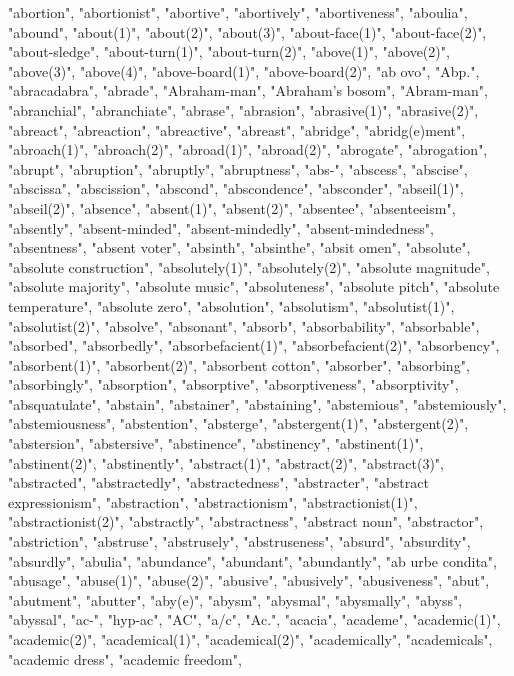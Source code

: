 "abortion",
"abortionist",
"abortive",
"abortively",
"abortiveness",
"aboulia",
"abound",
"about(1)",
"about(2)",
"about(3)",
"about-face(1)",
"about-face(2)",
"about-sledge",
"about-turn(1)",
"about-turn(2)",
"above(1)",
"above(2)",
"above(3)",
"above(4)",
"above-board(1)",
"above-board(2)",
"ab ovo",
"Abp.",
"abracadabra",
"abrade",
"Abraham-man",
"Abraham's bosom",
"Abram-man",
"abranchial",
"abranchiate",
"abrase",
"abrasion",
"abrasive(1)",
"abrasive(2)",
"abreact",
"abreaction",
"abreactive",
"abreast",
"abridge",
"abridg(e)ment",
"abroach(1)",
"abroach(2)",
"abroad(1)",
"abroad(2)",
"abrogate",
"abrogation",
"abrupt",
"abruption",
"abruptly",
"abruptness",
"abs-",
"abscess",
"abscise",
"abscissa",
"abscission",
"abscond",
"abscondence",
"absconder",
"abseil(1)",
"abseil(2)",
"absence",
"absent(1)",
"absent(2)",
"absentee",
"absenteeism",
"absently",
"absent-minded",
"absent-mindedly",
"absent-mindedness",
"absentness",
"absent voter",
"absinth",
"absinthe",
"absit omen",
"absolute",
"absolute construction",
"absolutely(1)",
"absolutely(2)",
"absolute magnitude",
"absolute majority",
"absolute music",
"absoluteness",
"absolute pitch",
"absolute temperature",
"absolute zero",
"absolution",
"absolutism",
"absolutist(1)",
"absolutist(2)",
"absolve",
"absonant",
"absorb",
"absorbability",
"absorbable",
"absorbed",
"absorbedly",
"absorbefacient(1)",
"absorbefacient(2)",
"absorbency",
"absorbent(1)",
"absorbent(2)",
"absorbent cotton",
"absorber",
"absorbing",
"absorbingly",
"absorption",
"absorptive",
"absorptiveness",
"absorptivity",
"absquatulate",
"abstain",
"abstainer",
"abstaining",
"abstemious",
"abstemiously",
"abstemiousness",
"abstention",
"absterge",
"abstergent(1)",
"abstergent(2)",
"abstersion",
"abstersive",
"abstinence",
"abstinency",
"abstinent(1)",
"abstinent(2)",
"abstinently",
"abstract(1)",
"abstract(2)",
"abstract(3)",
"abstracted",
"abstractedly",
"abstractedness",
"abstracter",
"abstract expressionism",
"abstraction",
"abstractionism",
"abstractionist(1)",
"abstractionist(2)",
"abstractly",
"abstractness",
"abstract noun",
"abstractor",
"abstriction",
"abstruse",
"abstrusely",
"abstruseness",
"absurd",
"absurdity",
"absurdly",
"abulia",
"abundance",
"abundant",
"abundantly",
"ab urbe condita",
"abusage",
"abuse(1)",
"abuse(2)",
"abusive",
"abusively",
"abusiveness",
"abut",
"abutment",
"abutter",
"aby(e)",
"abysm",
"abysmal",
"abysmally",
"abyss",
"abyssal",
"ac-",
"hyp-ac",
"AC",
"a/c",
"Ac.",
"acacia",
"academe",
"academic(1)",
"academic(2)",
"academical(1)",
"academical(2)",
"academically",
"academicals",
"academic dress",
"academic freedom",
